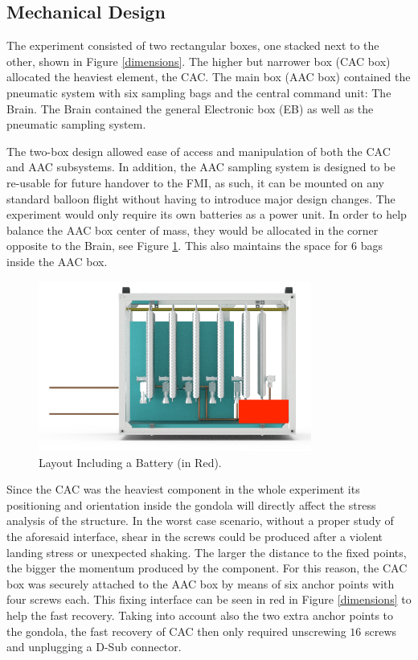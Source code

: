 \pagebreak
\subsection{Mechanical Design} \label{Mechanical_Design}
\label{sec:mechanical-design}

The experiment consisted of two rectangular boxes, one stacked next to the other, shown in Figure \ref{dimensions}. The higher but narrower box (CAC box) allocated the heaviest element, the CAC. The main box (AAC box) contained the pneumatic system with six sampling bags and the central command unit: The Brain. The Brain contained the general Electronic box (EB) as well as the pneumatic sampling system.

The two-box design allowed ease of access and manipulation of both the CAC and AAC subsystems. In addition, the AAC sampling system is designed to be re-usable for future handover to the FMI, as such, it can be mounted on any standard balloon flight without having to introduce major design changes. The experiment would only require its own batteries as a power unit. In order to help balance the AAC box center of mass, they would be allocated in the corner opposite to the Brain, see Figure \ref{battery_distribution}. This also maintains the space for 6 bags inside the AAC box.

\begin{figure}[H]
    \centering
    \includegraphics[width=0.8\textwidth]{4-experiment-design/img/Mechanical/Figure_15.png}
    \caption{Layout Including a Battery (in Red).}
    \label{battery_distribution}
\end{figure}

\pagebreak
Since the CAC was the heaviest component in the whole experiment its positioning and orientation inside the gondola will directly affect the stress analysis of the structure. In the worst case scenario, without a proper study of the aforesaid interface, shear in the screws could be produced after a violent landing stress or unexpected shaking. The larger the distance to the fixed points, the bigger the momentum produced by the component. For this reason, the CAC box was securely attached to the AAC box by means of six anchor points with four screws each. This fixing interface can be seen in red in Figure \ref{dimensions} to help the fast recovery. Taking into account also the two extra anchor points to the gondola, the fast recovery of CAC then only required unscrewing $16$ screws and unplugging a D-Sub connector.

